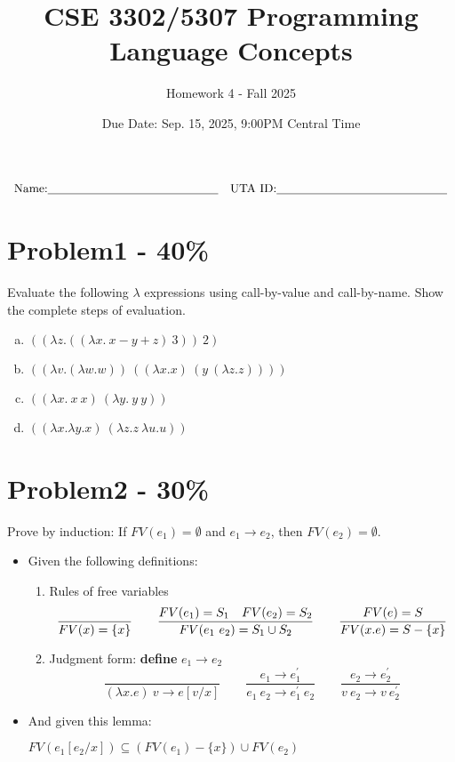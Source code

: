 \documentclass{article}
\newcommand{\answerboxbig}{
    \vspace{20cm} %
}
\newcommand{\studentinfo}{
    $$\begin{array}{cc}
        \noindent \text{Name:} \underline{\hspace{5cm}} &
            \text{UTA ID:} \underline{\hspace{5cm}}\\
    \end{array}$$
}
\begin{document}
\title{CSE 3302/5307 Programming Language Concepts}
\author{Homework 4 - Fall 2025}
\date{Due Date: Sep. 15, 2025, 9:00PM Central Time}
\maketitle
\thispagestyle{fancy}

\studentinfo

\section*{Problem1 - 40\%}

	Evaluate the following $\lambda$ expressions using call-by-value and call-by-name. Show the complete steps of evaluation.
	\begin{enumerate}[(a)]
		\item $((\lambda z.((\lambda x.\ x-y+z)\ 3))\ 2)$
		\item $((\lambda v.(\lambda w.w))\ ((\lambda x.x)\ (y\ (\lambda z.z))))$
		\item $((\lambda x.\ x\ x)\ (\lambda y.\ y\ y))$
		\item $((\lambda x. \lambda y. x)\ (\lambda z.z\ \lambda u.u))$
	\end{enumerate}

\answerboxbig

\section*{Problem2 - 30\%}

    Prove by induction: If $FV(e_{1})=\emptyset$ and $e_{1} \rightarrow e_{2}$, then $FV(e_{2})=\emptyset$.
    \begin{itemize}
    \item Given the following definitions:
    \begin{enumerate}
        \item Rules of free variables 
        \[
        \frac{}{FV(x)=\{x\}} \qquad
        \frac{FV(e_1) = S_1\quad FV(e_2) = S_2}{FV(e_1\ e_2)=S_1\cup S_2} \qquad
        \frac{FV(e) = S}{FV(\\x.e)=S-\{x\}}
        \]
        \item Judgment form: \textbf{define} $e_1\rightarrow e_2$
        \[
        \frac{}{(\lambda x.e)\ v \rightarrow e [v/x]}
        \qquad
        \frac{e_1 \rightarrow e_1^{'}}{e_1\ e_2 \rightarrow e_1^{'}\ e_2}
        \qquad
        \frac{e_2 \rightarrow e_2^{'}}{v\ e_2 \rightarrow v\ e_2^{'}}
        \]
    \end{enumerate}
    \item And given this lemma:
        \begin{lemma}\label{fv}
            $FV(e_1[e_2/x]) \subseteq (FV(e_1) - \{x\}) \cup FV(e_2)$
        \end{lemma}
    \end{itemize}
\end{document}

